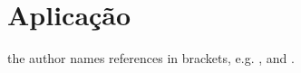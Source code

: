 \documentclass[12pt]{article}
\begin{document}
\section{Aplicação}

the author names references in brackets, e.g. \cite{knuth:84},
 and \cite{smith:99}.



\end{document}
